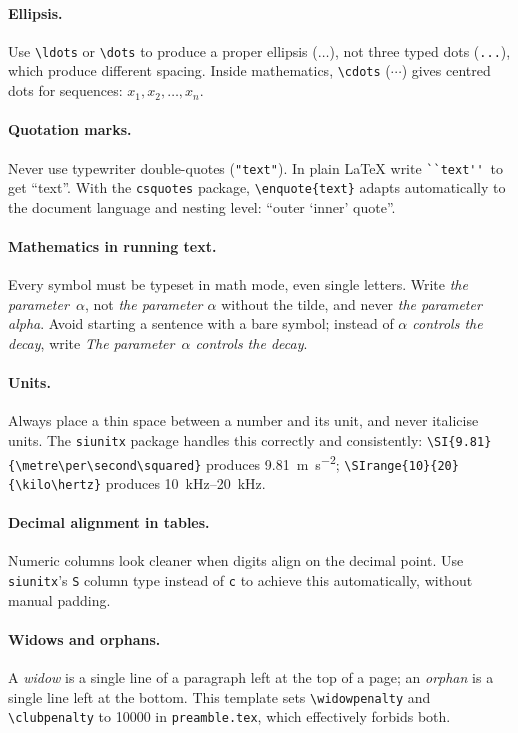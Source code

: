 \paragraph{Ellipsis.}
Use \verb|\ldots| or \verb|\dots| to produce a proper ellipsis
($\ldots$), not three typed dots (\verb|...|), which produce
different spacing.
Inside mathematics, \verb|\cdots| ($\cdots$) gives centred dots
for sequences: $x_1, x_2, \ldots, x_n$.

\paragraph{Quotation marks.}
Never use typewriter double-quotes (\verb|"text"|).
In plain \LaTeX{} write \verb|``text''|\ to get ``text''.
With the \texttt{csquotes} package, \verb|\enquote{text}| adapts
automatically to the document language and nesting level:
\enquote{outer \enquote{inner} quote}.

\paragraph{Mathematics in running text.}
Every symbol must be typeset in math mode, even single letters.
Write \emph{the parameter~$\alpha$}, not \emph{the parameter
$\alpha$} without the tilde, and never \emph{the parameter alpha}.
Avoid starting a sentence with a bare symbol; instead of
\emph{$\alpha$ controls the decay}, write
\emph{The parameter~$\alpha$ controls the decay}.

\paragraph{Units.}
Always place a thin space between a number and its unit, and never
italicise units.
The \texttt{siunitx} package handles this correctly and consistently:
\verb|\SI{9.81}{\metre\per\second\squared}| produces
\SI{9.81}{\metre\per\second\squared};
\verb|\SIrange{10}{20}{\kilo\hertz}| produces
\SIrange{10}{20}{\kilo\hertz}.

\paragraph{Decimal alignment in tables.}
Numeric columns look cleaner when digits align on the decimal point.
Use \texttt{siunitx}'s \texttt{S} column type instead of \texttt{c}
to achieve this automatically, without manual padding.

\paragraph{Widows and orphans.}
A \emph{widow} is a single line of a paragraph left at the top of a
page; an \emph{orphan} is a single line left at the bottom.
This template sets \verb|\widowpenalty| and \verb|\clubpenalty| to
\num{10000} in \texttt{preamble.tex}, which effectively forbids both.

\printbibliography[heading=subbibliography, title={References}]
